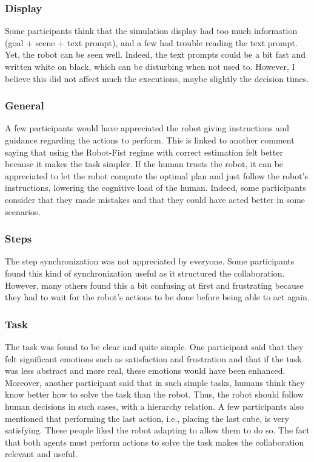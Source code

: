 \subsubsection{Display}
Some participants think that the simulation display had too much information (goal + scene + text prompt), and a few had trouble reading the text prompt. Yet, the robot can be seen well. Indeed, the text prompts could be a bit fast and written white on black, which can be disturbing when not used to. However, I believe this did not affect much the executions, maybe slightly the decision times. 

\subsubsection{General}
A few participants would have appreciated the robot giving instructions and guidance regarding the actions to perform. This is linked to another comment saying that using the Robot-Fist regime with correct estimation felt better because it makes the task simpler. If the human trusts the robot, it can be appreciated to let the robot compute the optimal plan and just follow the robot's instructions, lowering the cognitive load of the human. Indeed, some participants consider that they made mistakes and that they could have acted better in some scenarios. 

\subsubsection{Steps}
The step synchronization was not appreciated by everyone. Some participants found this kind of synchronization useful as it structured the collaboration. However, many others found this a bit confusing at first and frustrating because they had to wait for the robot's actions to be done before being able to act again.

\subsubsection{Task}
The task was found to be clear and quite simple. One participant said that they felt significant emotions such as satisfaction and frustration and that if the task was less abstract and more real, these emotions would have been enhanced. Moreover, another participant said that in such simple tasks, humans think they know better how to solve the task than the robot. Thus, the robot should follow human decisions in such cases, with a hierarchy relation. A few participants also mentioned that performing the last action, i.e., placing the last cube, is very satisfying. These people liked the robot adapting to allow them to do so. 
The fact that both agents must perform actions to solve the task makes the collaboration relevant and useful. 

